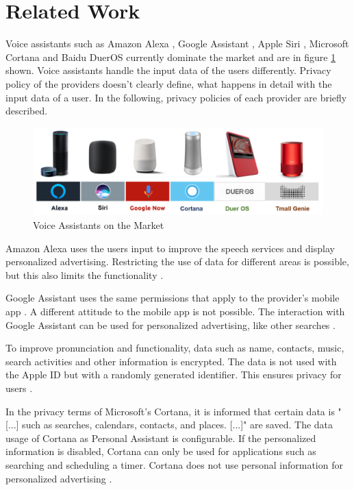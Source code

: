 \section{Related Work}
Voice assistants such as Amazon Alexa \cite{alexaAssitant}, Google Assistant \cite{googleAssistant}, Apple Siri \cite{siriAssistant}, Microsoft Cortana \cite{cortanaAssistant} and Baidu DuerOS \cite{baiduAssistant} currently dominate the market and are in figure \ref{fig:sprachassistenten} shown. Voice assistants handle the input data of the users differently. Privacy policy of the providers doesn't clearly define, what happens in detail with the input data of a user. In the following, privacy policies of each provider are briefly described.

\begin{figure}[h!]
	\centering
	\includegraphics[width=1\linewidth]{Picture/Sprachassistenten}
	\caption[Voice Assistants on the Market\cite{homeVoiceAssistants}]{Voice Assistants on the Market\cite{homeVoiceAssistants}}
	\label{fig:sprachassistenten}
\end{figure}

Amazon Alexa uses the users input to improve the speech services and display personalized advertising. Restricting the use of data for different areas is possible, but this also limits the functionality \cite{alexaPrivacy}.

Google Assistant uses the same permissions that apply to the provider's mobile app \cite{googleShare}. A different attitude to the mobile app is not possible. The interaction with Google Assistant can be used for personalized advertising, like other searches \cite{googlePrivacy}.

To improve pronunciation and functionality, data such as name, contacts, music, search activities and other information is encrypted. The data is not used with the Apple ID but with a randomly generated identifier. This ensures privacy for users \cite{siriPrivacy}.

In the privacy terms of Microsoft's Cortana, it is informed that certain data is "[...] such as searches, calendars, contacts, and places. [...]" are saved. The data usage of Cortana as Personal Assistant is configurable. If the personalized information is disabled, Cortana can only be used for applications such as searching and scheduling a timer. Cortana does not use personal information for personalized advertising \cite{cortanaAssistant}.

